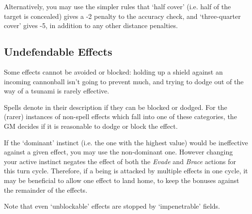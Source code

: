 Alternatively, you may use the simpler rules that `half cover' (i.e. half of the target is concealed) gives a -2 penalty to the accuracy check, and `three-quarter cover' gives -5, in addition to any other distance penalties. 

\subsection{Undefendable Effects}

Some effects cannot be avoided or blocked: holding up a shield against an incoming cannonball isn't going to prevent much, and trying to dodge out of the way of a tsunami is rarely effective. 

Spells denote in their description if they can be blocked or dodged. For the (rarer) instances of non-spell effects which fall into one of these categories, the GM decides if it is reasonable to dodge or block the effect. 

If the `dominant' instinct (i.e. the one with the highest value) would be ineffective against a given effect, you may use the non-dominant one. However changing your active instinct negates the effect of both the {\it Evade} and {\it Brace} actions for this turn cycle. Therefore, if a being is attacked by multiple effects in one cycle, it may be beneficial to allow one effect to land home, to keep the bonuses against the remainder of the effects. 

Note that even `unblockable' effects are stopped by `impenetrable' fields. 
